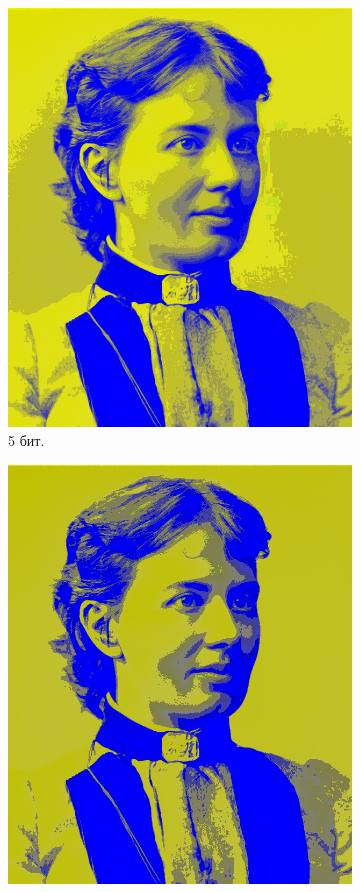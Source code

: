 \documentclass[11pt,a4paper,final]{article} %
\begin{document}
\begin{figure}[h!]
\begin{subfigure}[b]{0.3\linewidth}
		\includegraphics[width=\linewidth]{img/sofya2-5-5.jpg}
		\caption{5 бит.}
		\label{fig:s5}
	\end{subfigure}
	\hfill
	\begin{subfigure}[b]{0.3\linewidth}
		\centering
		\includegraphics[width=\linewidth]{img/sofya2-6-5.jpg}

\end{subfigure}
\end{figure}
\end{document}
